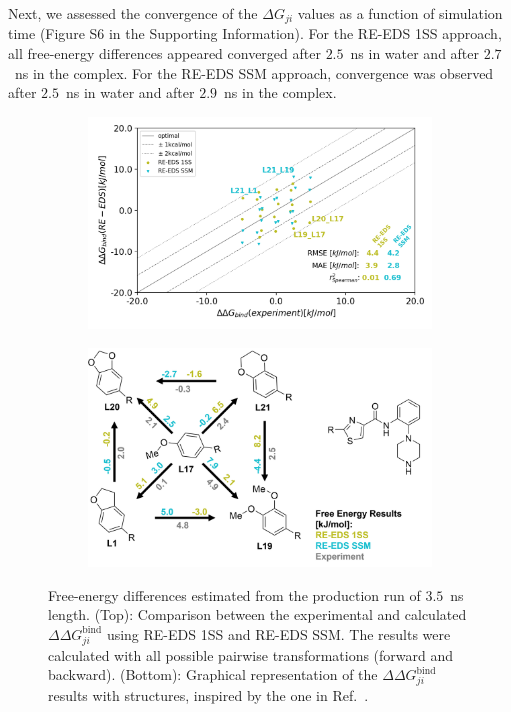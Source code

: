 Next, we assessed the convergence of the $\Delta G_{ji}$ values as a function of simulation time (Figure S6 in the Supporting Information). %
For the RE-EDS 1SS approach, all free-energy differences appeared converged after $2.5$~ns in water and after $2.7$~ns in the complex. For the RE-EDS SSM approach, convergence was observed after $2.5$~ns in water and after $2.9$~ns in the complex.

\begin{figure}[h]
    \centering
    \begin{subfigure}{0.85\columnwidth}
        \includegraphics[width=\textwidth]{fig/results/ringOpening/FE/RingClosure_system_final_results_4ns_comparison.png}
        \end{subfigure}
    \begin{subfigure}{0.85\columnwidth}
        \includegraphics[width=\textwidth]{fig/results/ringOpening/FE/ddG_bind_paper_comparison_reeds_only_4nsSimulation.png}
        \end{subfigure}
    \caption{Free-energy differences estimated from the production run of $3.5$~ns length. (Top): Comparison between the experimental and calculated $\Delta \Delta G^\text{bind}_{ji}$ using RE-EDS 1SS and RE-EDS SSM. The results were calculated with all possible pairwise transformations (forward and backward). (Bottom): Graphical representation of the $\Delta \Delta G^\text{bind}_{ji}$ results with structures, inspired by the one in Ref.~\cite{Wang2017}.}
    \label{fig:CHK1_set2_FreeEnergyCalculation}
\end{figure}

